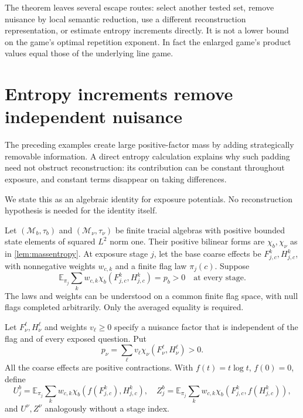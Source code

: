 \documentclass[11pt,reqno]{amsart}
\numberwithin{equation}{section}
\theoremstyle{definition}
\theoremstyle{remark}
\newcommand{\E}{\mathbb E}
\begin{document}
The theorem leaves several escape routes: select another tested set, remove nuisance by local semantic reduction, use a different reconstruction representation, or estimate entropy increments directly. It is not a lower bound on the game's optimal repetition exponent. In fact the enlarged game's product values equal those of the underlying line game.



\section{Entropy increments remove independent nuisance}\label{sec:cancellation}
The preceding examples create large positive-factor mass by adding strategically removable information. A direct entropy calculation explains why such padding need not obstruct reconstruction: its contribution can be constant throughout exposure, and constant terms disappear on taking differences.

We state this as an algebraic identity for exposure potentials. No reconstruction hypothesis is needed for the identity itself.

Let \((\mathcal M_b,\tau_b)\) and \((\mathcal M_\nu,\tau_\nu)\) be finite tracial algebras with positive bounded state elements of squared \(L^2\) norm one. Their positive bilinear forms are \(\chi_b,\chi_\nu\) as in \cref{lem:massentropy}. At exposure stage \(j\), let the base coarse effects be \(F_{j,c}^k,H_{j,c}^k\), with nonnegative weights \(w_{c,k}\) and a finite flag law \(\pi_j(c)\). Suppose
\[
 \E_{\pi_j}\sum_k w_{c,k}\chi_b(F_{j,c}^k,H_{j,c}^k)=p_b>0
 \quad\text{at every stage}.
\]
The laws and weights can be understood on a common finite flag space, with null flags completed arbitrarily. Only the averaged equality is required.

Let \(F_\nu^\ell,H_\nu^\ell\) and weights \(v_\ell\ge0\) specify a nuisance factor that is independent of the flag and of every exposed question. Put
\[
 p_\nu=\sum_\ell v_\ell\chi_\nu(F_\nu^\ell,H_\nu^\ell)>0.
\]
All the coarse effects are positive contractions. With \(f(t)=t\log t\), \(f(0)=0\), define
\[
 U_j^b=\E_{\pi_j}\sum_k w_{c,k}
             \chi_b(f(F_{j,c}^k),H_{j,c}^k),
 \quad
 Z_j^b=\E_{\pi_j}\sum_k w_{c,k}
             \chi_b(F_{j,c}^k,f(H_{j,c}^k)),
\]
and \(U^\nu,Z^\nu\) analogously without a stage index.
\end{document}
